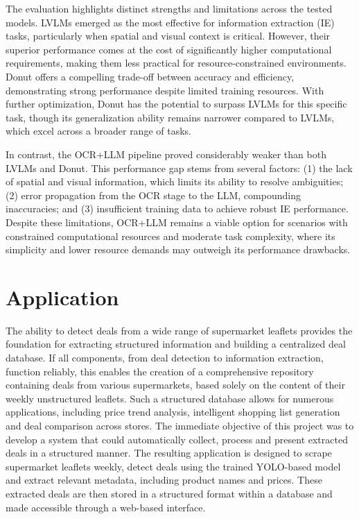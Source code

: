 \documentclass[11pt]{article}
\begin{document}
 The evaluation highlights distinct strengths and limitations across the tested models. LVLMs emerged as the most effective for information extraction (IE) tasks, particularly when spatial and visual context is critical. However, their superior performance comes at the cost of significantly higher computational requirements, making them less practical for resource-constrained environments. Donut offers a compelling trade-off between accuracy and efficiency, demonstrating strong performance despite limited training resources. With further optimization, Donut has the potential to surpass LVLMs for this specific task, though its generalization ability remains narrower compared to LVLMs, which excel across a broader range of tasks.

In contrast, the OCR+LLM pipeline proved considerably weaker than both LVLMs and Donut. This performance gap stems from several factors: (1) the lack of spatial and visual information, which limits its ability to resolve ambiguities; (2) error propagation from the OCR stage to the LLM, compounding inaccuracies; and (3) insufficient training data to achieve robust IE performance. Despite these limitations, OCR+LLM remains a viable option for scenarios with constrained computational resources and moderate task complexity, where its simplicity and lower resource demands may outweigh its performance drawbacks.


\section{Application}
\label{sec:application}
The ability to detect deals from a wide range of supermarket leaflets provides the foundation for extracting structured information and building a centralized deal database. If all components, from deal detection to information extraction, function reliably, this enables the creation of a comprehensive repository containing deals from various supermarkets, based solely on the content of their weekly unstructured leaflets. Such a structured database allows for numerous applications, including price trend analysis, intelligent shopping list generation and deal comparison across stores. The immediate objective of this project was to develop a system that could automatically collect, process and present extracted deals in a structured manner. The resulting application is designed to scrape supermarket leaflets weekly, detect deals using the trained YOLO-based model and extract relevant metadata, including product names and prices. These extracted deals are then stored in a structured format within a database and made accessible through a web-based interface.
\end{document}
